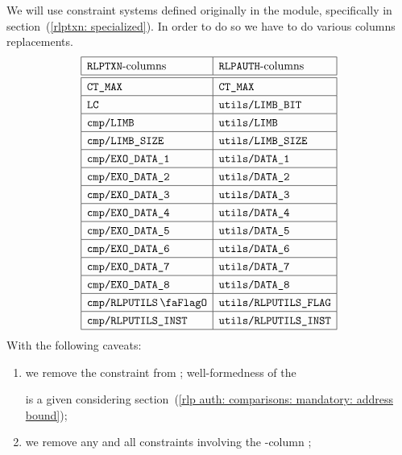 We will use constraint systems defined originally in
the \rlpTxnMod{} module, specifically
in section~(\ref{rlptxn: specialized}).
In order to do so we have to do various columns replacements.
\[
	\renewcommand{\arraystretch}{1.3}
	\begin{array}{|l|l|}
		\hline
		\text{\rlpTxnMod{}-columns}                 & \text{\rlpAuthMod{}-columns}           \\ \hline\hline
		\maxCt                                      & \maxCt                                 \\ \hline      
		\lc                                         & \rlpAuthUtilsColumnLimbBit             \\ \hline      
		\rlpTxnComputationColumnLimb                & \rlpAuthUtilsColumnLimb                \\ \hline      
		\rlpTxnComputationColumnLimbSize            & \rlpAuthUtilsColumnLimbSize            \\ \hline      
		\rlpTxnComputationColumnExoDataColumn{1}    & \rlpAuthUtilsColumnExoDataColumn{1}    \\ \hline      
		\rlpTxnComputationColumnExoDataColumn{2}    & \rlpAuthUtilsColumnExoDataColumn{2}    \\ \hline      
		\rlpTxnComputationColumnExoDataColumn{3}    & \rlpAuthUtilsColumnExoDataColumn{3}    \\ \hline      
		\rlpTxnComputationColumnExoDataColumn{4}    & \rlpAuthUtilsColumnExoDataColumn{4}    \\ \hline      
		\rlpTxnComputationColumnExoDataColumn{5}    & \rlpAuthUtilsColumnExoDataColumn{5}    \\ \hline      
		\rlpTxnComputationColumnExoDataColumn{6}    & \rlpAuthUtilsColumnExoDataColumn{6}    \\ \hline      
		\rlpTxnComputationColumnExoDataColumn{7}    & \rlpAuthUtilsColumnExoDataColumn{7}    \\ \hline      
		\rlpTxnComputationColumnExoDataColumn{8}    & \rlpAuthUtilsColumnExoDataColumn{8}    \\ \hline      
		\rlpTxnComputationColumnRlpUtilsFlag        & \rlpAuthUtilsColumnRlpUtilsFlag        \\ \hline      
		\rlpTxnComputationColumnRlpUtilsInstruction & \rlpAuthUtilsColumnRlpUtilsInstruction \\ \hline      
	\end{array}
\]
With the following caveats:
\begin{enumerate}
	\item
		we remove the \rlpTxnComputationColumnTrmFlag{} constraint from \rlpProcessAddressName{};
		well-formedness of the \address{} is a given considering
		section~(\ref{rlp auth: comparisons: mandatory: address bound});
	\item
		we remove any and all constraints involving the \rlpTxnMod{}-column \phaseEnd{};
\end{enumerate}

